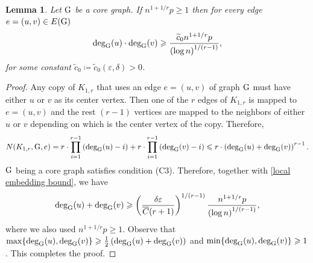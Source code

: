 \documentclass[a4paper,11pt,english,reqno]{amsart}
\numberwithin{equation}{section}
\renewcommand{\leq}{\leqslant}
\renewcommand{\geq}{\geqslant}
\newcommand{\cbar}{\overline{C}}
\newcommand{\tu}[1]{\textup{#1}}
\newtheorem{lemma}[theorem]{Lemma}
\begin{document}
			
			
			
			
			
			
			
			
			
			
			
			
			
			
			
			
			
			
			
			
			
			
			\begin{lemma}
				\label{product of degreess}
				Let $\tu{G}$ be a core graph. If $n^{1+1/r}p\geq 1$ then for every edge $e=(u,v)\in E(\tu{G})$
				\begin{equation}
					\label{product of deg:weak bound}
					\textup{deg}_{\tu{G}}(u)\cdot \textup{deg}_{\tu{G}}(v)\geq \frac{\widetilde{c}_{0}n^{1+1/r}p}{\left(\log n\right)^{1/(r-1)}},
				\end{equation}
				for some constant {$\widetilde{c}_{0}\coloneqq \widetilde{c}_{0}(\varepsilon, \delta)>0$}.
			\end{lemma}
			\begin{proof}
				Any copy of $K_{1,r}$ that uses an edge $e=(u,v)$ of graph $\tu{G}$ must have either $u$ or $v$ as its center vertex. Then one of the $r$ edges of $K_{1,r}$ is mapped to $e=(u,v)$ and the rest $(r-1)$ vertices are mapped to the neighbors of either $u$ or $v$ depending on which is the center vertex of the copy. Therefore, 
				\begin{equation}
					\label{local embedding bound}
					\begin{aligned}
						N(K_{1,r},\tu{G},e) = r\cdot\prod_{i=1}^{r-1}\left({\text{deg}_{\tu{G}}(u)-i}\right)+r\cdot\prod_{i=1}^{r-1}\left({\text{deg}_{\tu{G}}(v)-i}\right)\leq r\cdot \left(\text{deg}_{\tu{G}}(u)+\text{deg}_{\tu{G}}(v)\right)^{r-1}.
					\end{aligned}
				\end{equation}
				$\tu{G}$ being a core graph satisfies condition (C3). Therefore, together with \eqref{local embedding bound}, we have
				\begin{equation*}
					\text{deg}_{\tu{G}}(u)+\text{deg}_{\tu{G}}(v) \geq \left(\frac{\delta\varepsilon}{\cbar(r+1)}\right)^{1/(r-1)}\frac{n^{1+1/r}p}{\left(\log n\right)^{1/(r-1)}},
				\end{equation*}
				where we also used $n^{1+1/r}p\geq 1$. Observe that 
				$\max\{\text{deg}_{\tu{G}}(u),\text{deg}_{\tu{G}}(v)\}\geq \frac{1}{2} \left(\text{deg}_{\tu{G}}(u)+\text{deg}_{\tu{G}}(v)\right)$ and  $\min\{\text{deg}_{\tu{G}}(u),\text{deg}_{\tu{G}}(v)\}\geq 1$. This completes the proof.
			\end{proof}
			
\end{document}
